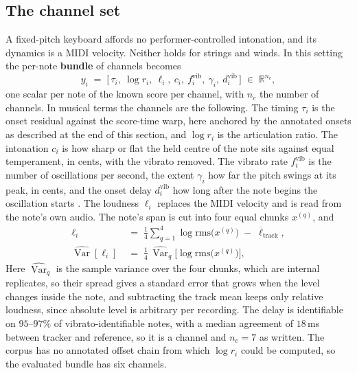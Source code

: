 \documentclass[11pt,a4paper]{report}
\newcommand{\R}{\mathbb{R}}
\begin{document}
\subsection{The channel set}
A fixed-pitch keyboard affords no performer-controlled intonation, and its
dynamics is a MIDI velocity. Neither holds for strings and winds. In this
setting the per-note \textbf{bundle} of channels becomes
\begin{equation}
  y_i \;=\; \bigl[\, \tau_i,\ \log r_i,\ \ell_i,\ c_i,\ f_i^{\mathrm{vib}},\ \gamma_i,\ d_i^{\mathrm{vib}} \,\bigr]
  \;\in\; \R^{n_c},
  \label{eq:phase2-channels}
\end{equation}
one scalar per note of the known score per channel, with $n_c$ the number
of channels. In musical terms the channels are the following. The timing
$\tau_i$ is the onset residual against the score-time warp, here anchored
by the annotated onsets as described at the end of this section, and $\log r_i$ is the articulation ratio. The
intonation $c_i$ is how sharp or flat the held centre of the note sits
against equal temperament, in cents, with the vibrato removed. The vibrato
rate $f_i^{\mathrm{vib}}$ is the number of oscillations per second, the
extent $\gamma_i$ how far the pitch swings at its peak, in cents, and the
onset delay $d_i^{\mathrm{vib}}$ how long after the note begins the
oscillation starts \cite{seashore1936}. The loudness $\ell_i$ replaces the
MIDI velocity and is read from the note's own audio. The note's span is cut
into four equal chunks $x^{(q)}$, and
\begin{align}
  \ell_i &\;=\; \frac{1}{4} \sum_{q=1}^{4} \log \mathrm{rms}\bigl(x^{(q)}\bigr)
  \;-\; \overline{\ell}_{\mathrm{track}},
  \label{eq:loudness}\\
  \widehat{\operatorname{Var}}[\ell_i] &\;=\; \frac{1}{4}\,
  \widehat{\operatorname{Var}}_{q}\bigl[\log \mathrm{rms}\bigl(x^{(q)}\bigr)\bigr],
  \nonumber
\end{align}
Here $\widehat{\operatorname{Var}}_q$ is the sample variance over the four
chunks, which are internal replicates, so their spread gives a standard
error that grows when the level changes inside the note, and subtracting
the track mean keeps only relative loudness, since absolute level is
arbitrary per recording. The delay is identifiable on $95$--$97\%$ of
vibrato-identifiable notes, with a median agreement of $18$\,ms between
tracker and reference, so it is a channel and $n_c = 7$ as written. The
corpus has no annotated offset chain from which $\log r_i$ could be
computed, so the evaluated bundle has six channels.
\end{document}
